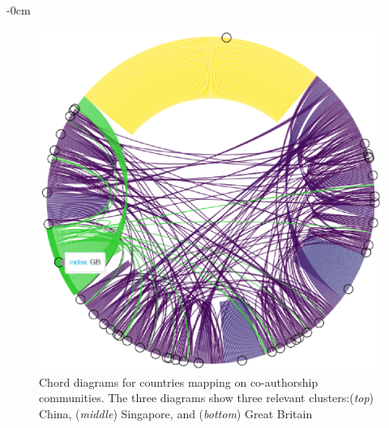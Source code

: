 \documentclass[jmse,review,submit,pdftex,moreauthors]{Definitions/mdpi}
\begin{document}
\begin{adjustwidth}{-\extralength}{0cm}
\begin{figure}[H]
	\includegraphics[height=0.3\textheight, keepaspectratio]{pics/coauthorship_country_chord_3.eps}
	\caption{Chord diagrams for countries mapping on co-authorship communities. The three diagrams show three relevant clusters:(\textit{top}) China, (\textit{middle}) Singapore, and (\textit{bottom}) Great Britain}\label{fig:fig7}
\end{figure}


\end{adjustwidth}
\end{document}
